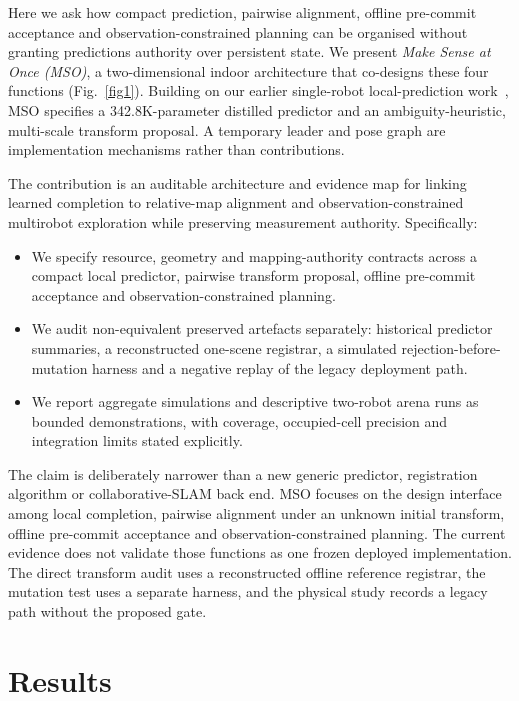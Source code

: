\documentclass[11pt]{article}
\begin{document}
Here we ask how compact prediction, pairwise alignment, offline pre-commit acceptance and observation-constrained planning can be organised without granting predictions authority over persistent state. We present \emph{Make Sense at Once (MSO)}, a two-dimensional indoor architecture that co-designs these four functions (Fig.~\ref{fig1}). Building on our earlier single-robot local-prediction work~\citep{gao2025senseexpo,gao2025mapping}, MSO specifies a 342.8K-parameter distilled predictor and an ambiguity-heuristic, multi-scale transform proposal. A temporary leader and pose graph are implementation mechanisms rather than contributions.

The contribution is an auditable architecture and evidence map for linking learned completion to relative-map alignment and observation-constrained multirobot exploration while preserving measurement authority. Specifically:
\begin{itemize}
	\item We specify resource, geometry and mapping-authority contracts across a compact local predictor, pairwise transform proposal, offline pre-commit acceptance and observation-constrained planning.
	\item We audit non-equivalent preserved artefacts separately: historical predictor summaries, a reconstructed one-scene registrar, a simulated rejection-before-mutation harness and a negative replay of the legacy deployment path.
	\item We report aggregate simulations and descriptive two-robot arena runs as bounded demonstrations, with coverage, occupied-cell precision and integration limits stated explicitly.
\end{itemize}

The claim is deliberately narrower than a new generic predictor, registration algorithm or collaborative-SLAM back end. MSO focuses on the design interface among local completion, pairwise alignment under an unknown initial transform, offline pre-commit acceptance and observation-constrained planning. The current evidence does not validate those functions as one frozen deployed implementation. The direct transform audit uses a reconstructed offline reference registrar, the mutation test uses a separate harness, and the physical study records a legacy path without the proposed gate.


\section{Results} \label{sec::results}
\end{document}
